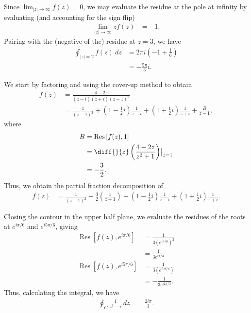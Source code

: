 \documentclass[10pt]{mypackage}
\DeclareMathOperator{\res}{Res}
\begin{document}
\begin{solution}[21.2]
  Since $\lim_{|z|\rightarrow\infty}f(z) = 0$, we may evaluate the residue at the pole at infinity by evaluating (and accounting for the sign flip)
  \begin{align*}
    \lim_{|z|\rightarrow\infty} zf(z) &= -1.
  \end{align*}
  Pairing with the (negative of the) residue at $z = 3$, we have
  \begin{align*}
    \oint_{|z|=2}f(z)\:dz &= 2\pi i \left( -1 + \frac{1}{6} \right)\\
                          &= -\frac{5\pi}{3}i.
  \end{align*}
\end{solution}
\begin{solution}[21.6]
  We start by factoring and using the cover-up method to obtain
  \begin{align*}
    f(z) &= \frac{4-2z}{\left( z-i \right)\left( z+i \right)\left( z-1 \right)^2}\\
         &= \frac{1}{\left( z-1 \right)^2} + \left( 1-\frac{1}{2}i \right)\frac{1}{z-i} + \left( 1 + \frac{1}{2}i \right)\frac{1}{z+i} + \frac{B}{z-1},
  \end{align*}
  where
  \begin{align*}
    B &= \res\left[ f(z),1 \right]\\
      &= \diff{}{z}\left( \frac{4-2z}{z^2+1} \right)\bigr\vert_{z=1}\\
      &= -\frac{3}{2}.
  \end{align*}
  Thus, we obtain the partial fraction decomposition of
  \begin{align*}
    f(z) &= \frac{1}{\left( z-1 \right)^2} -\frac{3}{2}\left( \frac{1}{z-1} \right) + \left( 1-\frac{1}{2}i \right)\frac{1}{z-i} + \left( 1 + \frac{1}{2}i \right) \frac{1}{z+i}.
  \end{align*}
\end{solution}
\begin{solution}[21.8]
  Closing the contour in the upper half plane, we evaluate the residues of the roots at $e^{i\pi/6}$ and $e^{i5\pi/6}$, giving
  \begin{align*}
    \res\left[ f(z),e^{i\pi/6} \right] &= \frac{1}{3\left( e^{i\pi/6} \right)^2}\\
                                       &= \frac{1}{3e^{i\pi/3}}\\
    \res\left[ f(z),e^{i5\pi/6} \right] &= \frac{1}{3\left( e^{i5\pi/6} \right)}\\
                                        &= -\frac{1}{3e^{i2\pi/3}}.
  \end{align*}
  Thus, calculating the integral, we have
  \begin{align*}
    \oint_{C}\frac{1}{z^3 - i}\:dz &= \frac{2i\pi}{3}.
  \end{align*}
\end{solution}
\end{document}

